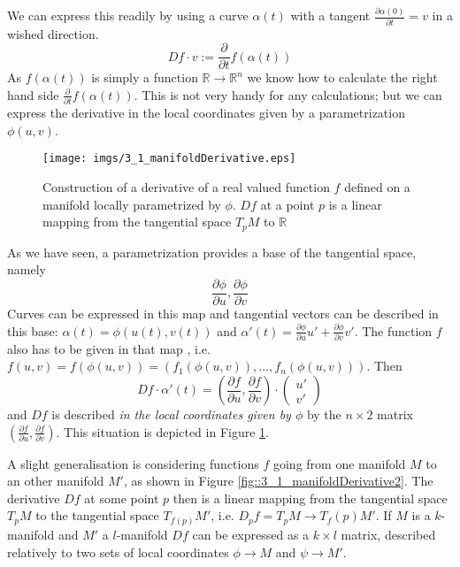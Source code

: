 We can express this readily by using a curve $\alpha (t)$ with a tangent $\frac{\partial \alpha(0)}{\partial t} = v$ in a wished direction.
\[Df \cdot v := \frac{\partial}{\partial t} f(\alpha(t))\]
As $f(\alpha(t))$ is simply a function $\mathbb R \rightarrow \mathbb R^n$ we know how to calculate the right hand side $\frac{\partial}{\partial t} f(\alpha(t))$. This is not very handy for any calculations; but we can express the derivative in the local coordinates given by a parametrization $\phi(u,v)$.

\begin{figure}
\begin{center}
\texttt{[image: imgs/3\_1\_manifoldDerivative.eps]}
\end{center}
\caption{Construction of a derivative of a real valued function $f$ defined on a manifold locally parametrized by $\phi$. $Df$ at a point $p$ is a linear mapping from the tangential space $T_p M$ to $\mathbb R$}
\label{fig::3_1_manifoldDerivative}
\end{figure}

As we have seen, a parametrization provides a base of the tangential space, namely 
\[\frac{\partial\phi}{\partial u}, \frac{\partial\phi}{\partial v}\] 
Curves can be expressed in this map and tangential vectors can be described in this base: $\alpha(t) = \phi(u(t),v(t))$ and $\alpha'(t) = \frac{\partial\phi}{\partial u} u' + \frac{\partial\phi}{\partial v} v'$. The function $f$ also has to be given in that map , i.e. $f(u,v) = f(\phi(u,v)) = (f_1(\phi(u,v)),...,f_n(\phi(u,v)))$. Then 
\[Df \cdot \alpha'(t) = (\frac{\partial f}{\partial u}, \frac{\partial f}{\partial v}) \cdot \begin{pmatrix}
	u' \\ v'\end{pmatrix}\]
and $Df$ is described \emph{in the local coordinates given by $\phi$} by the $ n \times 2$ matrix $(\frac{\partial f}{\partial u}, \frac{\partial f}{\partial v})$. This situation is depicted in Figure \ref{fig::3_1_manifoldDerivative}.

A slight generalisation is considering functions $f$ going from one manifold $M$ to an other manifold $M'$, as shown in Figure \ref{fig::3_1_manifoldDerivative2}. The derivative $Df$ at some point $p$ then is a linear mapping from the tangential space $T_pM$  to the tangential space $T_{f(p)} M'$, i.e. $D_p f = T_p M \rightarrow T_f(p) M'$. If $M$ is a $k$-manifold and $M'$ a $l$-manifold $Df$ can be expressed as a $k\times l$ matrix, described relatively to two sets of local coordinates $\phi \rightarrow M$ and $\psi \rightarrow M'$.


